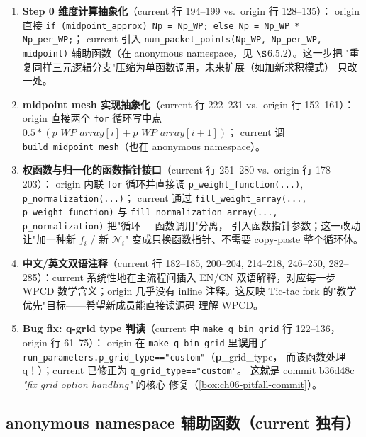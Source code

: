 \begin{enumerate}
  \item \textbf{Step 0 维度计算抽象化}（current 行 194--199 vs.~origin 行
        128--135）：
        origin 直接 \texttt{if (midpoint\_approx) Np = Np\_WP; else Np
        = Np\_WP * Np\_per\_WP;}；
        current 引入 \texttt{num\_packet\_points(Np\_WP, Np\_per\_WP, midpoint)}
        辅助函数（在 anonymous namespace，见 \(\S\)6.5.2）。这一步把
        "重复同样三元逻辑分支"压缩为单函数调用，未来扩展（如加新求积模式）
        只改一处。
  \item \textbf{midpoint mesh 实现抽象化}（current 行 222--231 vs.~origin
        行 152--161）：
        origin 直接两个 \texttt{for} 循环写中点
        \(0.5*(p\_WP\_array[i] + p\_WP\_array[i+1])\)；
        current 调 \texttt{build\_midpoint\_mesh}（也在 anonymous namespace）。
  \item \textbf{权函数与归一化的函数指针接口}（current 行 251--280 vs.~origin
        行 178--203）：
        origin 内联 \texttt{for} 循环并直接调
        \texttt{p\_weight\_function(...)}, \texttt{p\_normalization(...)}；
        current 通过 \texttt{fill\_weight\_array(...,
        p\_weight\_function)} 与 \texttt{fill\_normalization\_array(...,
        p\_normalization)} 把"循环 + 函数调用"分离，
        引入函数指针参数；这一改动让"加一种新 \(f_i\) / 新 \(\mathcal{N}_i\)"
        变成只换函数指针、不需要 copy-paste 整个循环体。
  \item \textbf{中文/英文双语注释}（current 行 182--185, 200--204,
        214--218, 246--250, 282--285）：current 系统性地在主流程间插入
        EN/CN 双语解释，对应每一步 WPCD 数学含义；origin 几乎没有 inline
        注释。这反映 Tic-tac fork 的"教学优先"目标——希望新成员能直接读源码
        理解 WPCD。
  \item \textbf{Bug fix: q-grid type 判读}（current 中 \texttt{make\_q\_bin\_grid}
        行 122--136，origin 行 61--75）：
        origin 在 \texttt{make\_q\_bin\_grid} 里\textbf{误用}了
        \texttt{run\_parameters.p\_grid\_type=="custom"}（\textbf{p}\_grid\_type，
        而该函数处理 q！）；current 已修正为 \texttt{q\_grid\_type=="custom"}。
        这就是 commit b36d48c \emph{"fix grid option handling"} 的核心
        修复（\cref{box:ch06-pitfall-commit}）。
\end{enumerate}

\subsection{anonymous namespace 辅助函数（current 独有）}
\label{subsec:ch06-code-helpers}

